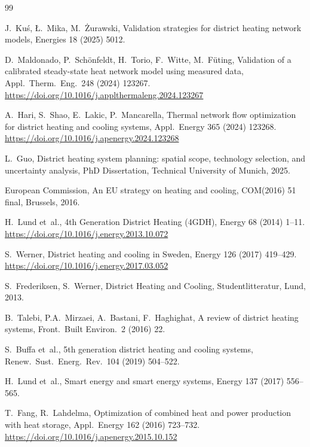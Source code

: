 \documentclass[review,3p]{elsarticle}
\begin{document}

\begin{thebibliography}{99}

J.~Ku\'{s}, {\L}.~Mika, M.~{\.Z}urawski,
Validation strategies for district heating network models,
Energies 18 (2025) 5012.

D.~Maldonado, P.~Sch\"{o}nfeldt, H.~Torio, F.~Witte, M.~F\"{u}ting,
Validation of a calibrated steady-state heat network model using
measured data,
Appl.\ Therm.\ Eng.\ 248 (2024) 123267.
\url{https://doi.org/10.1016/j.applthermaleng.2024.123267}

A.~Hari, S.~Shao, E.~Lakic, P.~Mancarella,
Thermal network flow optimization for district heating and cooling
systems,
Appl.\ Energy 365 (2024) 123268.
\url{https://doi.org/10.1016/j.apenergy.2024.123268}

L.~Guo,
District heating system planning: spatial scope, technology selection,
and uncertainty analysis,
PhD Dissertation, Technical University of Munich, 2025.

European Commission, An EU strategy on heating and cooling,
COM(2016) 51 final, Brussels, 2016.

H.~Lund et~al.,
4th Generation District Heating (4GDH),
Energy 68 (2014) 1--11.
\url{https://doi.org/10.1016/j.energy.2013.10.072}

S.~Werner,
District heating and cooling in Sweden,
Energy 126 (2017) 419--429.
\url{https://doi.org/10.1016/j.energy.2017.03.052}

S.~Frederiksen, S.~Werner,
District Heating and Cooling, Studentlitteratur, Lund, 2013.

B.~Talebi, P.A.~Mirzaei, A.~Bastani, F.~Haghighat,
A review of district heating systems,
Front.\ Built Environ.\ 2 (2016) 22.

S.~Buffa et~al.,
5th generation district heating and cooling systems,
Renew.\ Sust.\ Energ.\ Rev.\ 104 (2019) 504--522.

H.~Lund et~al.,
Smart energy and smart energy systems,
Energy 137 (2017) 556--565.

T.~Fang, R.~Lahdelma,
Optimization of combined heat and power production with heat storage,
Appl.\ Energy 162 (2016) 723--732.
\url{https://doi.org/10.1016/j.apenergy.2015.10.152}


\end{thebibliography}
\end{document}
